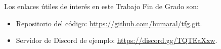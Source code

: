 \label{anexoenlaces}
Los enlaces útiles de interés en este Trabajo Fin de Grado son:

\begin{itemize}
    \item Repositorio del código: \url{https://github.com/humaral/tfg.git}.
    
    \item Servidor de Discord de ejemplo: \url{https://discord.gg/TQTEaXxw}.
\end{itemize}
 

